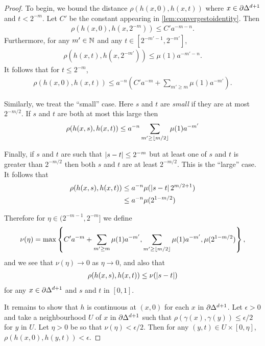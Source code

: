 \documentclass[a4paper]{article}
\begin{document}
\begin{proof}
  To begin, we bound the distance $\rho(h(x,0), h(x,t))$
  where $x \in \partial \Delta^{d+1}$ and $t < 2^{-m}$. Let $C'$ be the
  constant appearing in \cref{lem:convergestoidentity}. Then 
  \begin{align*}
    \rho(h(x,0), h(x,2^{-m})) \leq C'a^{-m-n}.
  \end{align*}
  Furthermore, for any $m' \in \mathbb{N}$ and any $t \in [2^{-m'-1}, 2^{-m'}]$,
  \begin{align*}
    \rho(h(x,t), h(x,2^{-m'})) \leq \mu(1)a^{-m'-n}.
  \end{align*}
  It follows that for $t \leq 2^{-m}$,
  \begin{align*}
    \rho(h(x,0), h(x,t)) \leq a^{-n}\left(C'a^{-m} + \sum_{m' \geq m}
          \mu(1)a^{-m'}\right).
  \end{align*}

  Similarly, we treat the ``small'' case. Here $s$ and $t$ are \emph{small} if
  they are at most $2^{-m/2}$. If $s$ and $t$ are both at most this large
  then
  \begin{align*}
    \rho(h(x,s), h(x,t)) \leq a^{-n} \sum_{m' \geq \lfloor m/2\rfloor} \mu(1) a^{-m'}
  \end{align*}

  Finally, if $s$ and $t$ are such that $\left|s-t\right| \leq 2^{-m}$ but at least
  one of $s$ and $t$ is greater than $2^{-m/2}$ then both $s$ and $t$ are at
  least $2^{-m/2}$. This is the ``large'' case. It follows that 
  \begin{align*}
    \rho(h(x,s), h(x,t)) &\leq a^{-n} \mu(\left|s-t\right| 2^{m/2 + 1}) \\
                         &\leq a^{-n} \mu(2^{1-m/2})
  \end{align*}
  
  Therefore for $\eta \in (2^{-m-1}, 2^{-m}]$ we define
  \begin{align*}
    \nu(\eta)  = \max\left\{
      C'a^{-m} + \sum_{m' \geq m} \mu(1)a^{-m'},
      \sum_{m' \geq \lfloor m/2\rfloor} \mu(1) a^{-m'},
      \mu(2^{1-m/2})
    \right\},
  \end{align*}
  and we see that $\nu(\eta) \to 0$ as $\eta \to 0$, and also that
  \begin{align*}
    \rho(h(x,s), h(x,t)) \leq \nu(\left|s-t\right|)
  \end{align*}
  for any $x \in \partial\Delta^{d+1}$ and $s$ and $t$ in $[0,1]$.

  It remains to show that $h$ is continuous at $(x,0)$ for each $x$ in
  $\partial\Delta^{d+1}$. Let $\epsilon > 0$ and take a neighbourhood $U$ of
  $x$ in $\partial\Delta^{d+1}$ such that $\rho(\gamma(x), \gamma(y)) \leq
  \epsilon/2$ for $y$ in $U$. Let $\eta > 0$ be so that $\nu(\eta) <
  \epsilon/2$. Then for any $(y, t) \in U \times [0, \eta]$, $\rho(h(x,0),
  h(y,t)) < \epsilon$.
\end{proof}
\end{document}
